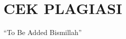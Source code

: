 \chapter*{\uppercase{CEK PLAGIASI}}
\vspace{1cm}

\begin{center}
    ``To Be Added Bismillah''
\end{center}
\newpage